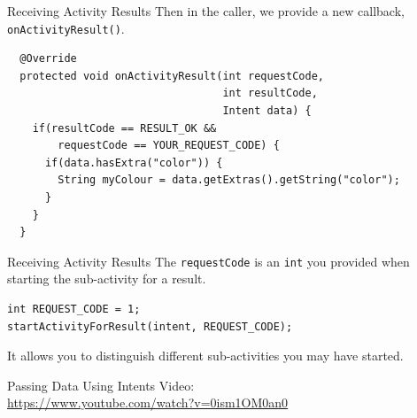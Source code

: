 \documentclass[aspectratio=169]{beamer}
\begin{document}
\begin{frame}[fragile]{Receiving Activity Results}
Then in the caller, we provide a new callback, {\tt onActivityResult()}. \\
\vspace{1em}
\begin{Verbatim}
  @Override
  protected void onActivityResult(int requestCode, 
                                  int resultCode, 
                                  Intent data) {
    if(resultCode == RESULT_OK && 
        requestCode == YOUR_REQUEST_CODE) {
      if(data.hasExtra("color")) {
        String myColour = data.getExtras().getString("color");
      }
    }
  }
\end{Verbatim}
\end{frame}



\begin{frame}[fragile]{Receiving Activity Results}
\Large
The {\tt requestCode} is an {\tt int} you provided when starting the
sub-activity for a result. \\
\vspace{1em}
\begin{Verbatim}
int REQUEST_CODE = 1;
startActivityForResult(intent, REQUEST_CODE);
\end{Verbatim}
\vspace{1em}
It allows you to distinguish different sub-activities you may have started.
\end{frame}



\begin{frame}{Passing Data Using Intents}
Video: \\
\url{https://www.youtube.com/watch?v=0ism1OM0an0}
\end{frame}
\end{document}
